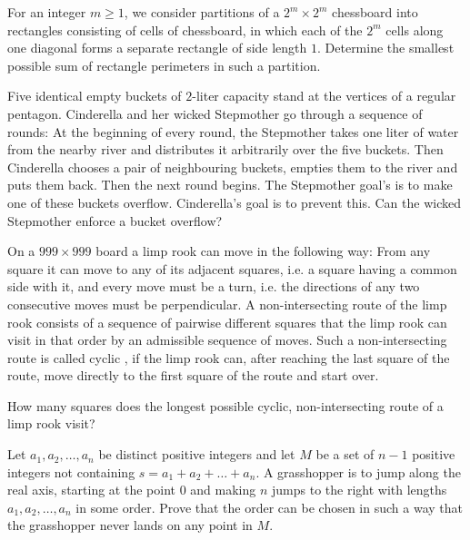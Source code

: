 \item[\textbf{C4.}]
For an integer 
$m\geq 1$, 
 we consider partitions of a 
$2^m\times 2^m$
 chessboard into rectangles consisting of cells of chessboard, in which each of the 
$2^m$
 cells along one diagonal forms a separate rectangle of side length 
$1$.
 Determine the smallest possible sum of rectangle perimeters in such a partition.

\item[\textbf{C5.}]
Five identical empty buckets of 
$2$-liter capacity stand at the vertices of a regular pentagon. Cinderella and her wicked Stepmother go through a sequence of rounds: At the beginning of every round, the Stepmother takes one liter of water from the nearby river and distributes it arbitrarily over the five buckets. Then Cinderella chooses a pair of neighbouring buckets, empties them to the river and puts them back. Then the next round begins. The Stepmother goal's is to make one of these buckets overflow. Cinderella's goal is to prevent this. Can the wicked Stepmother enforce a bucket overflow?

\item[\textbf{C6.}]
On a 
$999\times 999$
 board a 
limp rook
 can move in the following way: From any square it can move to any of its adjacent squares, i.e. a square having a common side with it, and every move must be a turn, i.e. the directions of any two consecutive moves must be perpendicular. A 
non-intersecting route
 of the limp rook consists of a sequence of pairwise different squares that the limp rook can visit in that order by an admissible sequence of moves. Such a non-intersecting route is called 
cyclic
, if the limp rook can, after reaching the last square of the route, move directly to the first square of the route and start over.


How many squares does the longest possible cyclic, non-intersecting route of a limp rook visit?

\item[\textbf{C7.}]
Let 
$ a_1, a_2, \ldots , a_n$
 be distinct positive integers and let 
$ M$
 be a set of 
$ n - 1$
 positive integers not containing 
$ s = a_1 + a_2 + \ldots + a_n.$
 A grasshopper is to jump along the real axis, starting at the point 
$ 0$
 and making 
$ n$
 jumps to the right with lengths 
$ a_1, a_2, \ldots , a_n$
 in some order. Prove that the order can be chosen in such a way that the grasshopper never lands on any point in 
$ M.$

